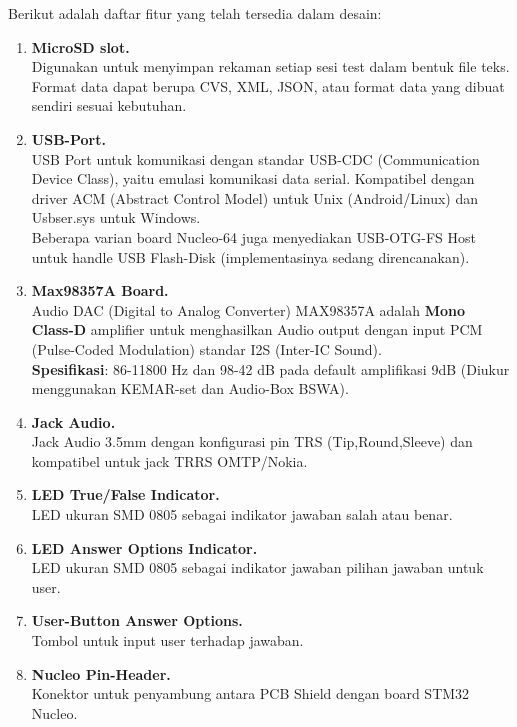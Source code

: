\documentclass[12pt,]{article}
\begin{document}
	Berikut adalah daftar fitur yang telah tersedia dalam desain:
	\begin{enumerate}
		\item \textbf{MicroSD slot.}\\
		Digunakan untuk menyimpan rekaman setiap sesi test dalam bentuk file teks.
		Format data dapat berupa CVS, XML, JSON, atau format data yang dibuat sendiri sesuai kebutuhan.
		
		\item \textbf{USB-Port.}\\
		USB Port untuk komunikasi dengan standar USB-CDC (Communication Device Class), yaitu emulasi komunikasi data serial.
		Kompatibel dengan driver ACM (Abstract Control Model) untuk Unix (Android/Linux) dan Usbser.sys untuk Windows.\\
		Beberapa varian board Nucleo-64 juga menyediakan USB-OTG-FS Host untuk handle USB Flash-Disk (implementasinya sedang direncanakan).
		
		\newpage
		\item \textbf{Max98357A Board.}\\
		Audio DAC (Digital to Analog Converter) MAX98357A adalah \textbf{Mono Class-D} amplifier untuk menghasilkan Audio output dengan input
		PCM (Pulse-Coded Modulation) standar I2S (Inter-IC Sound).\\
		\textbf{Spesifikasi}: 86-11800 Hz dan 98-42 dB pada default amplifikasi 9dB (Diukur menggunakan KEMAR-set dan Audio-Box BSWA).
		
		\item \textbf{Jack Audio.}\\ 
		Jack Audio 3.5mm dengan konfigurasi pin TRS (Tip,Round,Sleeve) dan kompatibel untuk jack TRRS OMTP/Nokia.
		
		\item \textbf{LED True/False Indicator.}\\
		LED ukuran SMD 0805 sebagai indikator jawaban salah atau benar.
		
		\item \textbf{LED Answer Options Indicator.}\\
		LED ukuran SMD 0805 sebagai indikator jawaban pilihan jawaban untuk user.
		
		\item \textbf{User-Button Answer Options.}\\
		Tombol untuk input user terhadap jawaban.
		
		\item \textbf{Nucleo Pin-Header.}\\
		Konektor untuk penyambung antara PCB Shield dengan board STM32 Nucleo.
	\end{enumerate}
\end{document}

